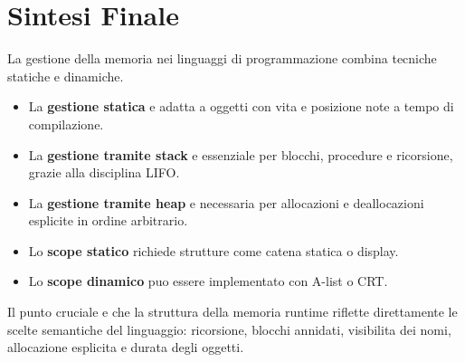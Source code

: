 \documentclass{article}
\begin{document}
\section{Sintesi Finale}

La gestione della memoria nei linguaggi di programmazione combina tecniche statiche e dinamiche.

\begin{itemize}
  \item La \textbf{gestione statica} e adatta a oggetti con vita e posizione note a tempo di compilazione.
  \item La \textbf{gestione tramite stack} e essenziale per blocchi, procedure e ricorsione, grazie alla disciplina LIFO.
  \item La \textbf{gestione tramite heap} e necessaria per allocazioni e deallocazioni esplicite in ordine arbitrario.
  \item Lo \textbf{scope statico} richiede strutture come catena statica o display.
  \item Lo \textbf{scope dinamico} puo essere implementato con A-list o CRT.
\end{itemize}

Il punto cruciale e che la struttura della memoria runtime riflette direttamente le scelte semantiche del linguaggio: ricorsione, blocchi annidati, visibilita dei nomi, allocazione esplicita e durata degli oggetti.
\end{document}
